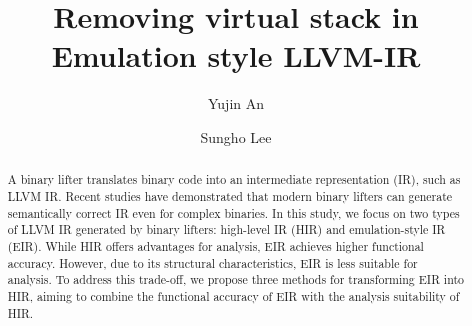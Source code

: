 \documentclass[sigplan,10pt]{acmart}
\begin{document}
\title{Removing virtual stack in Emulation style LLVM-IR}

\author{Yujin An}

\author{Sungho Lee}

\begin{abstract}
A binary lifter translates binary code into an intermediate representation
(IR), such as LLVM IR. Recent studies have demonstrated that modern binary
lifters can generate semantically correct IR even for complex binaries. In this
study, we focus on two types of LLVM IR generated by binary lifters: high-level
IR (HIR) and emulation-style IR (EIR). While HIR offers advantages for
analysis, EIR achieves higher functional accuracy. However, due to its
structural characteristics, EIR is less suitable for analysis. To address this
trade-off, we propose three methods for transforming EIR into HIR, aiming to
combine the functional accuracy of EIR with the analysis suitability of HIR.
\end{abstract}

\maketitle








\end{document}
